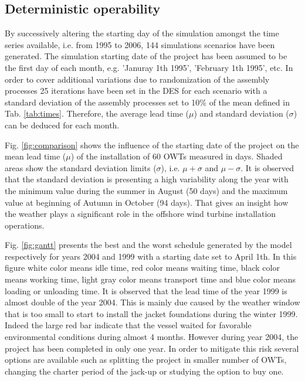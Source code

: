 \subsection{Deterministic operability}
By successively altering the starting day of the simulation amongst the time series available, i.e. from 1995 to 2006, 144 simulations scenarios have been generated. The simulation starting date of the project has been assumed to be the first day of each month, e.g. 'Januray 1th 1995', 'February 1th 1995', etc. In order to cover additional variations due to randomization of the assembly processes 25 iterations have been set in the DES for each scenario with a standard deviation of the assembly processes set to 10\% of the mean defined in Tab. \ref{tab:times}. Therefore, the average lead time ($\mu$) and standard deviation ($\sigma$) can be deduced for each month.

Fig. \ref{fig:comparison} shows the influence of the starting date of the project on the mean lead time ($\mu$) of the installation of 60 OWTs measured in days. Shaded areas show the standard deviation limits ($\sigma$), i.e. $\mu + \sigma$ and $\mu - \sigma$. It is observed that the standard deviation is presenting a high variability along the year with the minimum value during the summer in August (50 days) and the maximum value at beginning of Autumn in October (94 days). That gives an insight how the weather plays a significant role in the offshore wind turbine installation operations.

Fig. \ref{fig:gantt} presents the best and the worst schedule generated by the model respectively for years 2004 and 1999 with a starting date set to April 1th. In this figure white color means idle time, red color means waiting time, black color means working time, light gray color means transport time and blue color means loading or unloading time. It is observed that the lead time of the year 1999 is almost double of the year 2004. This is mainly due caused by the weather window that is too small to start to install the jacket foundations during the winter 1999. Indeed the large red bar indicate that the vessel waited for favorable environmental conditions during almost 4 months. However during year 2004, the project has been completed in only one year. In order to mitigate this risk several options are available such as splitting the project in smaller number of OWTs, changing the charter period of the jack-up or studying the option to buy one.
